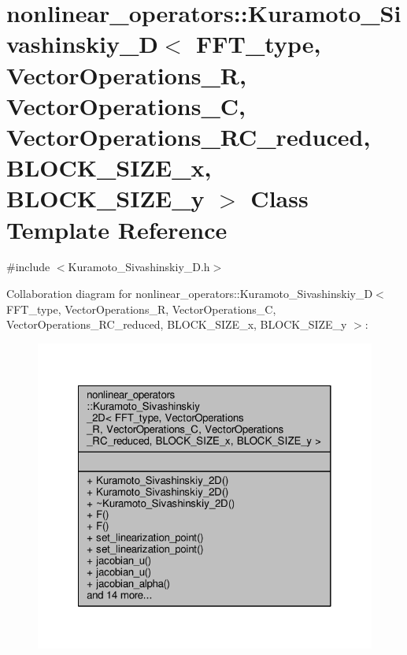 \hypertarget{classnonlinear__operators_1_1Kuramoto__Sivashinskiy__2D}{\section{nonlinear\-\_\-operators\-:\-:Kuramoto\-\_\-\-Sivashinskiy\-\_\-D$<$ F\-F\-T\-\_\-type, Vector\-Operations\-\_\-\-R, Vector\-Operations\-\_\-\-C, Vector\-Operations\-\_\-\-R\-C\-\_\-reduced, B\-L\-O\-C\-K\-\_\-\-S\-I\-Z\-E\-\_\-x, B\-L\-O\-C\-K\-\_\-\-S\-I\-Z\-E\-\_\-y $>$ Class Template Reference}
\label{classnonlinear__operators_1_1Kuramoto__Sivashinskiy__2D}
}


{\ttfamily \#include $<$Kuramoto\-\_\-\-Sivashinskiy\-\_\-D.\-h$>$}



Collaboration diagram for nonlinear\-\_\-operators\-:\-:Kuramoto\-\_\-\-Sivashinskiy\-\_\-D$<$ F\-F\-T\-\_\-type, Vector\-Operations\-\_\-\-R, Vector\-Operations\-\_\-\-C, Vector\-Operations\-\_\-\-R\-C\-\_\-reduced, B\-L\-O\-C\-K\-\_\-\-S\-I\-Z\-E\-\_\-x, B\-L\-O\-C\-K\-\_\-\-S\-I\-Z\-E\-\_\-y $>$\-:
\nopagebreak
\begin{figure}[H]
\begin{center}
\leavevmode
\includegraphics[width=320pt]{classnonlinear__operators_1_1Kuramoto__Sivashinskiy__2D__coll__graph}
\end{center}
\end{figure}
